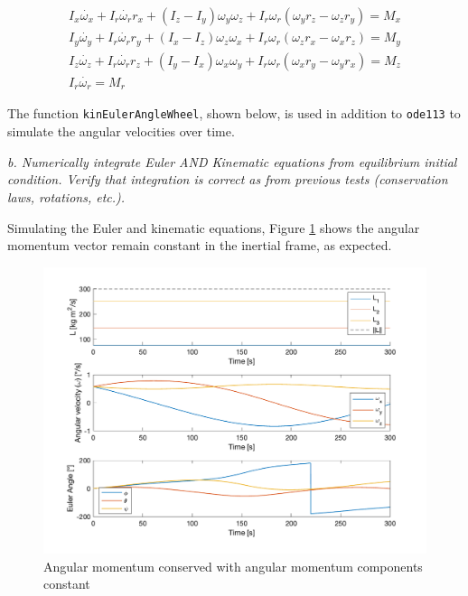 \begin{align*}
    I_x \dot{\omega_x} + I_r \dot{\omega_r} r_x + (I_z - I_y) \omega_y \omega_z 
    + I_r \omega_r (\omega_y r_z - \omega_z r_y) = M_x \\
    I_y \dot{\omega_y} + I_r \dot{\omega_r} r_y + (I_x - I_z) \omega_z \omega_x 
    + I_r \omega_r (\omega_z r_x - \omega_x r_z) = M_y \\
    I_z \dot{\omega_z} + I_r \dot{\omega_r} r_z + (I_y - I_x) \omega_x \omega_y 
    + I_r \omega_r (\omega_x r_y - \omega_y r_x) = M_z \\
    I_r \dot{\omega_r} = M_r
\end{align*}

The function \texttt{kinEulerAngleWheel}, shown below, is used in addition to \texttt{ode113} to simulate the angular velocities over time.



\textit{b. Numerically integrate Euler AND Kinematic equations from equilibrium initial condition. Verify that integration is correct as from previous tests (conservation laws, rotations, etc.).}

Simulating the Euler and kinematic equations, Figure \ref{fig:ps4_problem3b} shows the angular momentum vector remain constant in the inertial frame, as expected.

\begin{figure}[H]
\centering
\includegraphics[scale=0.6]{Images/ps4_problem3b.png}
\caption{Angular momentum conserved with angular momentum components constant}
\label{fig:ps4_problem3b}
\end{figure}

